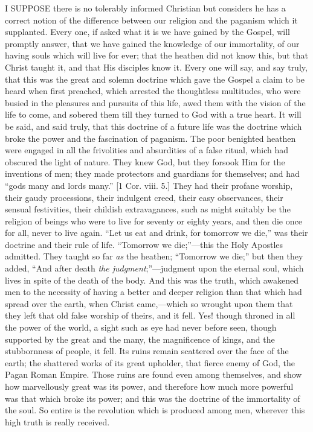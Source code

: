 I SUPPOSE there is no tolerably informed Christian but
considers he has a correct notion of the difference
between our religion and the paganism which it
supplanted. Every one, if asked what it is we have gained
by the Gospel, will promptly answer, that we have gained
the knowledge of our immortality, of our having souls
which will live for ever; that the heathen did not know
this, but that Christ taught it, and that His disciples
know it. Every one will say, and say truly, that this was
the great and solemn doctrine which gave the Gospel a
claim to be heard when first preached, which arrested the
thoughtless multitudes, who were busied in the pleasures
and pursuits of this life, awed them with the vision of
the life to come, and sobered them till they turned to
God with a true heart. It will be said, and said truly,
that this doctrine of a future life was the doctrine
which broke the power and the fascination of paganism.
The poor benighted heathen were engaged in all the
frivolities and absurdities of a false ritual, which had
obscured the light of nature. They knew God, but they
forsook Him for the inventions of men; they made
protectors and guardians for themselves; and had
``gods many and lords many.'' [1 Cor. viii. 5.]
They had their profane worship, their gaudy processions,
their indulgent creed, their easy observances, their
sensual festivities, their childish extravagances, such
as might suitably be the religion of beings who were to
live for seventy or eighty years, and then die once for
all, never to live again. ``Let us eat and drink, for
tomorrow we die,'' was their doctrine and their rule
of life. ``Tomorrow we die;''—this the Holy
Apostles admitted. They taught so far \emph{as} the
heathen; ``Tomorrow we die;'' but then they
added, ``And after death \emph{the judgment};''—judgment
upon the eternal soul, which lives in spite of the death
of the body. And this was the truth, which awakened men
to the necessity of having a better and deeper religion
than that which had spread over the earth, when Christ
came,—which so wrought upon them that they left that
old false worship of theirs, and it fell. Yes! though
throned in all the power of the world, a sight such as
eye had never before seen, though supported by the great
and the many, the magnificence of kings, and the
stubbornness of people, it fell. Its ruins remain
scattered over the face of the earth; the shattered works
of its great upholder, that fierce enemy of God, the
Pagan Roman Empire. Those ruins are found even among themselves, and show how marvellously great was its power,
and therefore how much more powerful was that which broke
its power; and this was the doctrine of the immortality
of the soul. So entire is the revolution which is
produced among men, wherever this high truth is really
received.

